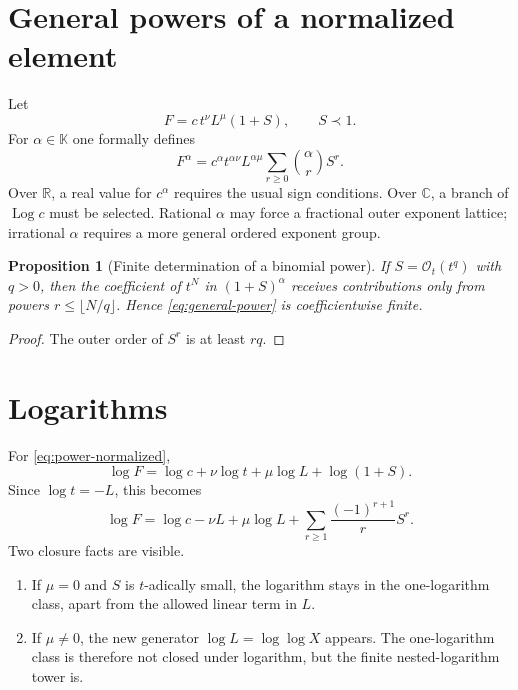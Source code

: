 \documentclass[11pt,oneside]{book}
\newtheorem{proposition}[theorem]{Proposition}
\theoremstyle{definition}
\theoremstyle{remark}
\DeclareMathOperator{\Log}{Log}
\newcommand{\K}{\mathbb K}
\newcommand{\R}{\mathbb R}
\newcommand{\C}{\mathbb C}
\newcommand{\bigO}{\mathcal O}
\newcommand{\precdom}{\prec}
\begin{document}
\section{General powers of a normalized element}
Let
\begin{equation}\label{eq:power-normalized}
 F=c\,t^\nu L^\mu(1+S),
 \qquad S\precdom1.
\end{equation}
For $\alpha\in\K$ one formally defines
\begin{equation}\label{eq:general-power}
 F^\alpha=c^\alpha t^{\alpha\nu}L^{\alpha\mu}
 \sum_{r\ge0}\binom{\alpha}{r}S^r.
\end{equation}
Over $\R$, a real value for $c^\alpha$ requires the usual sign conditions.
Over $\C$, a branch of $\Log c$ must be selected.  Rational $\alpha$ may
force a fractional outer exponent lattice; irrational $\alpha$ requires a
more general ordered exponent group.

\begin{proposition}[Finite determination of a binomial power]
If $S=\bigO_t(t^q)$ with $q>0$, then the coefficient of $t^N$ in
$(1+S)^\alpha$ receives contributions only from powers
$r\le\lfloor N/q\rfloor$.  Hence \eqref{eq:general-power} is
coefficientwise finite.
\end{proposition}
\begin{proof}
The outer order of $S^r$ is at least $rq$.
\end{proof}

\section{Logarithms}
For \eqref{eq:power-normalized},
\begin{equation}\label{eq:log-normalized}
 \log F=\log c+\nu\log t+\mu\log L+\log(1+S).
\end{equation}
Since $\log t=-L$, this becomes
\begin{equation}\label{eq:log-normalized-expanded}
 \log F=\log c-\nu L+\mu\log L
 +\sum_{r\ge1}\frac{(-1)^{r+1}}rS^r.
\end{equation}
Two closure facts are visible.
\begin{enumerate}
\item If $\mu=0$ and $S$ is $t$-adically small, the logarithm stays in the
      one-logarithm class, apart from the allowed linear term in $L$.
\item If $\mu\ne0$, the new generator $\log L=\log\log X$ appears.  The
      one-logarithm class is therefore not closed under logarithm, but the
      finite nested-logarithm tower is.
\end{enumerate}
\end{document}
